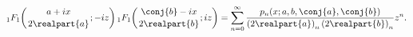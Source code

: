 \[\mathop{{{}_{1}F_{1}}\/}\nolimits\!\left({a+ix\atop 2\realpart{a}};-iz\right)%
\mathop{{{}_{1}F_{1}}\/}\nolimits\!\left({\conj{b}-ix\atop 2\realpart{b}};iz%
\right)=\sum_{n=0}^{\infty}\frac{\mathop{p_{n}\/}\nolimits\!\left(x;a,b,\conj{%
a},\conj{b}\right)}{\left(2\realpart{a}\right)_{n}\left(2\realpart{b}\right)_{%
n}}z^{n}.\]